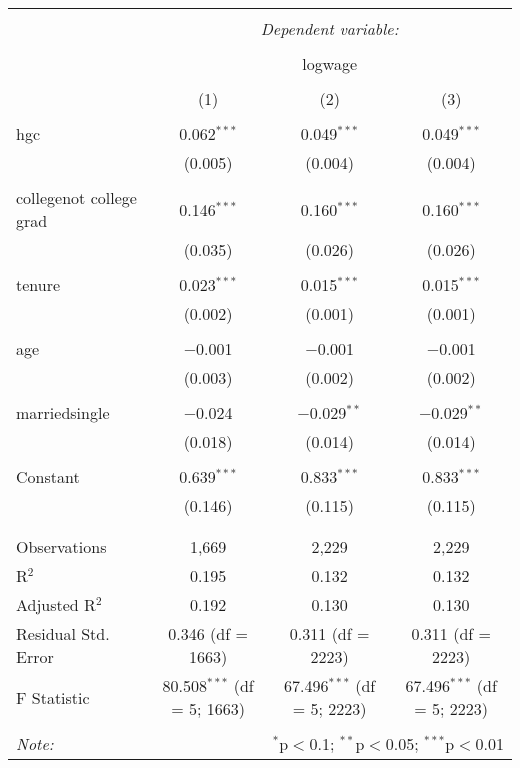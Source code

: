 \documentclass{article}
\begin{document}
\begin{table}[!htbp] \centering
  \caption{}
  \label{}
\begin{tabular}{@{\extracolsep{5pt}}lccc}
\\[-1.8ex]\hline
\hline \\[-1.8ex]
 & \multicolumn{3}{c}{\textit{Dependent variable:}} \\
\cline{2-4}
\\[-1.8ex] & \multicolumn{3}{c}{logwage} \\
\\[-1.8ex] & (1) & (2) & (3)\\
\hline \\[-1.8ex]
 hgc & 0.062$^{***}$ & 0.049$^{***}$ & 0.049$^{***}$ \\
  & (0.005) & (0.004) & (0.004) \\
  & & & \\
 collegenot college grad & 0.146$^{***}$ & 0.160$^{***}$ & 0.160$^{***}$ \\
  & (0.035) & (0.026) & (0.026) \\
  & & & \\
 tenure & 0.023$^{***}$ & 0.015$^{***}$ & 0.015$^{***}$ \\
  & (0.002) & (0.001) & (0.001) \\
  & & & \\
 age & $-$0.001 & $-$0.001 & $-$0.001 \\
  & (0.003) & (0.002) & (0.002) \\
  & & & \\
 marriedsingle & $-$0.024 & $-$0.029$^{**}$ & $-$0.029$^{**}$ \\
  & (0.018) & (0.014) & (0.014) \\
  & & & \\
 Constant & 0.639$^{***}$ & 0.833$^{***}$ & 0.833$^{***}$ \\
  & (0.146) & (0.115) & (0.115) \\
  & & & \\
\hline \\[-1.8ex]
Observations & 1,669 & 2,229 & 2,229 \\
R$^{2}$ & 0.195 & 0.132 & 0.132 \\
Adjusted R$^{2}$ & 0.192 & 0.130 & 0.130 \\
Residual Std. Error & 0.346 (df = 1663) & 0.311 (df = 2223) & 0.311 (df = 2223) \\
F Statistic & 80.508$^{***}$ (df = 5; 1663) & 67.496$^{***}$ (df = 5; 2223) & 67.496$^{***}$ (df = 5; 2223) \\
\hline
\hline \\[-1.8ex]
\textit{Note:}  & \multicolumn{3}{r}{$^{*}$p$<$0.1; $^{**}$p$<$0.05; $^{***}$p$<$0.01} \\
\end{tabular}
\end{table} 
\end{document}
